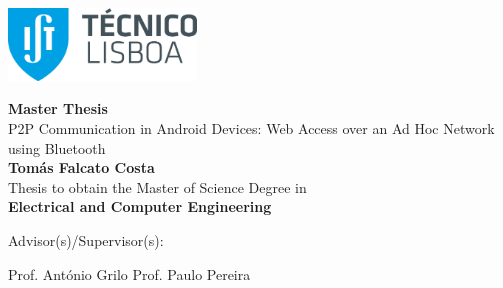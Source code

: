 
\begin{titlepage}
\includegraphics[width=5cm]{images/ist_logo}~\\[2.0cm]
\begin{center}
{\LARGE \textbf{Master Thesis}}\\[1.0cm]
{\Large P2P Communication in Android Devices: Web Access over an Ad Hoc Network using Bluetooth}\\[1.0cm]
{\Large \textbf{Tomás Falcato Costa}}\\[1.0cm]
{\large Thesis to obtain the Master of Science Degree in}\\[1.0cm]
{\LARGE \textbf{Electrical and Computer Engineering}}\\[1.0cm]

\begin{minipage}[t]{.5\textwidth}
  \begin{flushright}
    {\large Advisor(s)/Supervisor(s):\:}
  \end{flushright}
\end{minipage}%
\begin{minipage}[t]{.5\textwidth}
  \begin{flushleft}
    {Prof. António Grilo
    \newline Prof. Paulo Pereira}
  \end{flushleft}
\end{minipage}\\[1.0cm]


\end{center}
\end{titlepage}

